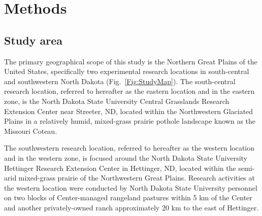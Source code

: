 \documentclass[fire,article,submit,oneauthor,pdftex]{Definitions/mdpi}
\begin{document}
 
\section{Methods} 

\subsection{Study area}

The primary geographical scope of this study is the Northern Great Plains of the United States, specifically two experimental research locations in south-central and southwestern North Dakota (Fig.~\ref{Fig:StudyMap}). 
The south-central research location, referred to hereafter as the eastern location and in the eastern zone, is the North Dakota State University Central Grasslands Research Extension Center near Streeter, ND, located within the Northwestern Glaciated Plains in a relatively humid, mixed-grass prairie pothole landscape known as the Missouri Coteau. 

The southwestern research location, referred to hereafter as the western location and in the western zone, is focused around the North Dakota State University Hettinger Research Extension Center in Hettinger, ND, located within the semi-arid mixed-grass prairie of the Northwestern Great Plains. 
Research activities at the western location were conducted by North Dakota State University personnel on two blocks of Center-managed rangeland pastures within 5 km of the Center and another privately-owned ranch approximately 20 km to the east of Hettinger.
\end{document}
